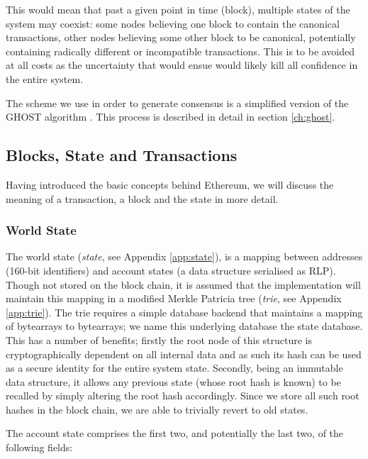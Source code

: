 \documentclass[9pt,oneside]{amsart}
\begin{document}
\begin{multicols}{2}
This would mean that past a given point in time (block), multiple states of the system may coexist: some nodes believing one block to contain the canonical transactions, other nodes believing some other block to be canonical, potentially containing radically different or incompatible transactions. This is to be avoided at all costs as the uncertainty that would ensue would likely kill all confidence in the entire system.

The scheme we use in order to generate consensus is a simplified version of the GHOST algorithm \cite{ghost}. This process is described in detail in section \ref{ch:ghost}.

\subsection{Blocks, State and Transactions} \label{ch:bst}

Having introduced the basic concepts behind Ethereum, we will discuss the meaning of a transaction, a block and the state in more detail.

\subsubsection{World State} \label{ch:state}

The world state (\textit{state}, see Appendix \ref{app:state}), is a mapping between addresses (160-bit identifiers) and account states (a data structure serialised as RLP). Though not stored on the block chain, it is assumed that the implementation will maintain this mapping in a modified Merkle Patricia tree (\textit{trie}, see Appendix \ref{app:trie}). The trie requires a simple database backend that maintains a mapping of bytearrays to bytearrays; we name this underlying database the state database. This has a number of benefits; firstly the root node of this structure is cryptographically dependent on all internal data and as such its hash can be used as a secure identity for the entire system state. Secondly, being an immutable data structure, it allows any previous state (whose root hash is known) to be recalled by simply altering the root hash accordingly. Since we store all such root hashes in the block chain, we are able to trivially revert to old states.

The account state comprises the first two, and potentially the last two, of the following fields:


\end{multicols}
\end{document}
